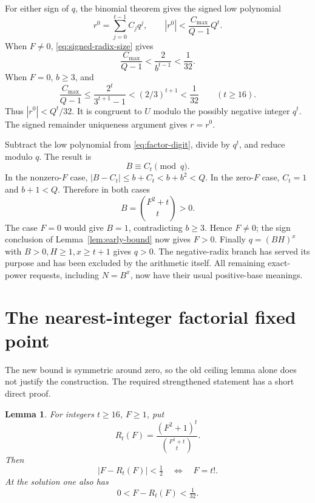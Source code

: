 \documentclass[11pt]{article}
\newtheorem{lemma}[theorem]{Lemma}
\theoremstyle{definition}\newtheorem{definition}[theorem]{Definition}
\begin{document}
For either sign of \(q\), the binomial theorem gives the signed
low polynomial
\[
 r^0=\sum_{j=0}^{t-1}C_jq^j,\qquad
 |r^0|<\frac{C_{\max}}{Q-1}Q^t.
\]
When \(F\ne0\), \eqref{eq:signed-radix-size} gives
\[
 \frac{C_{\max}}{Q-1}
 <\frac{2}{b^{t-1}}<\frac1{32}.
\]
When \(F=0\), \(b\ge3\), and
\[
 \frac{C_{\max}}{Q-1}
 \le\frac{2^t}{3^{t+1}-1}
 <(2/3)^{t+1}<\frac1{32}
 \qquad(t\ge16).
\]
Thus \(|r^0|<Q^t/32\). It is congruent to \(U\) modulo
the possibly negative integer \(q^t\). The signed remainder
uniqueness argument gives \(r=r^0\).

Subtract the low polynomial from \eqref{eq:factor-digit},
divide by \(q^t\), and reduce modulo \(q\). The result is
\[
 B\equiv C_t\pmod q.
\]
In the nonzero-\(F\) case, \(|B-C_t|\le b+C_t<b+b^2<Q\).
In the zero-\(F\) case, \(C_t=1\) and \(b+1<Q\).
Therefore in both cases
\begin{equation}\label{eq:B-exact}
 B=\binom{F^2+t}{t}>0.
\end{equation}
The case \(F=0\) would give \(B=1\), contradicting \(b\ge3\).
Hence \(F\ne0\); the sign conclusion of
Lemma~\ref{lem:early-bound} now gives \(F>0\).
Finally \(q=(BH)^x\) with \(B>0,H\ge1,x\ge t+1\) gives \(q>0\).
The negative-radix branch has served its purpose and has been excluded
by the arithmetic itself. All remaining exact-power requests, including
\(N=B^x\), now have their usual positive-base meanings.

\section{The nearest-integer factorial fixed point}

The new bound is symmetric around zero, so the old ceiling lemma alone
does not justify the construction. The required strengthened statement
has a short direct proof.

\begin{lemma}\label{lem:nearest-factorial}
For integers \(t\ge16\), \(F\ge1\), put
\[
 R_t(F)=\frac{(F^2+1)^t}{\binom{F^2+t}{t}}.
\]
Then
\[
 |F-R_t(F)|<\tfrac12\quad\Longleftrightarrow\quad F=t!.
\]
At the solution one also has
\[
 0<F-R_t(F)<\tfrac1{32}.
\]
\end{lemma}
\end{document}
